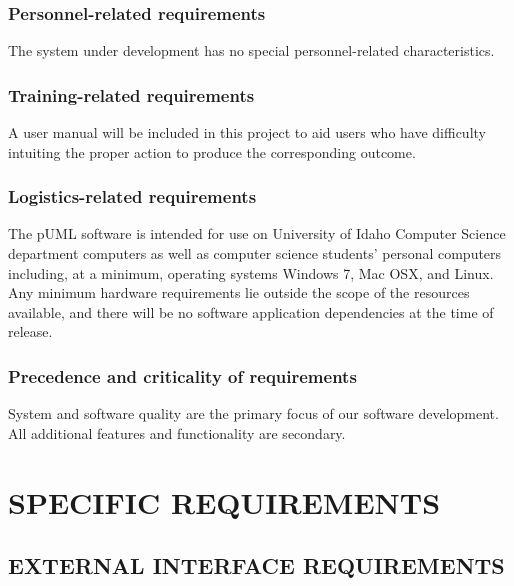 \documentclass[twoside,letterpaper]{article}
\begin{document}
\subsubsection[Personnel{}-related requirements]{\bfseries
Personnel-related requirements}
{
The system under development has no special personnel-related
characteristics. }

\subsubsection[Training{}-related requirements]{\bfseries
Training-related requirements}
{
A user manual will be included in this project to aid users who have difficulty intuiting the proper action to produce the corresponding outcome.
}

\subsubsection[Logistics{}-related requirements]{\bfseries
Logistics-related requirements}
{
The pUML software is intended for use on University of Idaho Computer Science department computers as well as computer science students' personal computers including, at a minimum, operating systems Windows 7, Mac OSX, and Linux.
Any minimum hardware requirements lie outside the scope of the resources available,
and there will be no software application dependencies at the time of release.
}

\subsubsection[Precedence and criticality of requirements]{\bfseries
Precedence and criticality of requirements}
{
System and software quality are the primary focus of our software development. All additional features and functionality are secondary. 
}












\clearpage\section[SPECIFIC REQUIREMENTS]{\bfseries
SPECIFIC REQUIREMENTS}

\subsection[EXTERNAL INTERFACE REQUIREMENTS]{\bfseries
EXTERNAL INTERFACE REQUIREMENTS}
\end{document}

